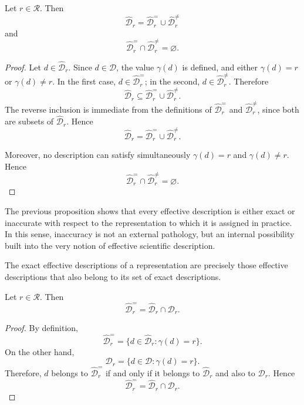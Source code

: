 \begin{proposition}
\label{prop:effective_description_partition}
Let \(r \in \mathcal{R}\). Then
\[
\hat{\mathcal{D}}_r
=
\hat{\mathcal{D}}^{=}_r \cup \hat{\mathcal{D}}^{\neq}_r
\]
and
\[
\hat{\mathcal{D}}^{=}_r \cap \hat{\mathcal{D}}^{\neq}_r = \varnothing.
\]
\end{proposition}

\begin{proof}
Let \(d \in \hat{\mathcal{D}}_r\). Since \(d \in \mathcal{D}\), the value \(\gamma(d)\) is defined, and
either \(\gamma(d)=r\) or \(\gamma(d)\neq r\). In the first case, \(d \in \hat{\mathcal{D}}^{=}_r\); in the
second, \(d \in \hat{\mathcal{D}}^{\neq}_r\). Therefore
\[
\hat{\mathcal{D}}_r
\subseteq
\hat{\mathcal{D}}^{=}_r \cup \hat{\mathcal{D}}^{\neq}_r.
\]
The reverse inclusion is immediate from the definitions of
\(\hat{\mathcal{D}}^{=}_r\) and \(\hat{\mathcal{D}}^{\neq}_r\), since both are subsets of
\(\hat{\mathcal{D}}_r\). Hence
\[
\hat{\mathcal{D}}_r
=
\hat{\mathcal{D}}^{=}_r \cup \hat{\mathcal{D}}^{\neq}_r.
\]

Moreover, no description can satisfy simultaneously \(\gamma(d)=r\) and \(\gamma(d)\neq r\). Hence
\[
\hat{\mathcal{D}}^{=}_r \cap \hat{\mathcal{D}}^{\neq}_r = \varnothing.
\]
\end{proof}

The previous proposition shows that every effective description is either exact or inaccurate with
respect to the representation to which it is assigned in practice. In this sense, inaccuracy is not an
external pathology, but an internal possibility built into the very notion of effective scientific
description.

The exact effective descriptions of a representation are precisely those effective descriptions that
also belong to its set of exact descriptions.

\begin{proposition}
\label{prop:exact_effective_descriptions_intersection}
Let \(r \in \mathcal{R}\). Then
\[
\hat{\mathcal{D}}^{=}_r = \hat{\mathcal{D}}_r \cap \mathcal{D}_r.
\]
\end{proposition}

\begin{proof}
By definition,
\[
\hat{\mathcal{D}}^{=}_r
=
\{d \in \hat{\mathcal{D}}_r : \gamma(d)=r\}.
\]
On the other hand,
\[
\mathcal{D}_r
=
\{d \in \mathcal{D} : \gamma(d)=r\}.
\]
Therefore, \(d\) belongs to \(\hat{\mathcal{D}}^{=}_r\) if and only if it belongs to
\(\hat{\mathcal{D}}_r\) and also to \(\mathcal{D}_r\). Hence
\[
\hat{\mathcal{D}}^{=}_r = \hat{\mathcal{D}}_r \cap \mathcal{D}_r.
\]
\end{proof}

